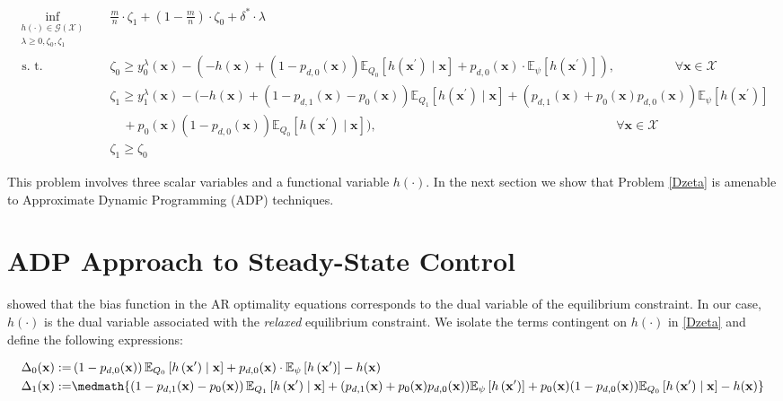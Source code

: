 \documentclass[12pt,a4paper]{article}
\newcommand{\bx}{\mathbf{x}}
\begin{document}
\begin{align} 
	 \inf_{\substack{h(\cdot)\in \mathcal{G}(\mathcal{X})\\\lambda\geq0,\zeta_0,\zeta_1}} & \quad
	\frac{m}{n} \cdot \zeta_1+\left(1-\frac{m}{n}\right) \cdot \zeta_0+\delta^* \cdot \lambda \label{Dzeta} \tag{D$_\zeta$}\\ 
	\text { s. t. }
	& \quad \zeta_0\geq y_0^\lambda(\bx) - {(-h(\bx)+\left(1-p_{d,0}(\bx)\right) \mathbb{E}_{Q_0}\left[h\left(\bx^{\prime}\right) \mid \bx\right]+p_{d,0}(\bx) \cdot \mathbb{E}_\psi\left[h\left(\bx^{\prime}\right)\right])},  \hspace{2cm}  \forall \bx \in \mathcal{X} \nonumber\\
	& \quad \zeta_1\geq y_1^\lambda(\bx)-
(-h(\bx)+\left(1-p_{d,1}(\bx) - p_0(\bx)\right) \mathbb{E}_{Q_1}\left[h\left(\bx^{\prime}\right) \mid \bx\right]+(p_{d, 1}(\bx)+ p_0(\bx)p_{d,0}(\bx)) \mathbb{E}_\psi\left[h\left(\bx^{\prime}\right)\right] \nonumber\\
& \quad \quad + p_0(\bx)(1-p_{d,0}(\bx)) \mathbb{E}_{Q_0}\left[h\left(\bx^{\prime}\right) \mid \bx\right]),
 \hspace{8cm} \forall \bx \in \mathcal{X} \nonumber\\
	& \quad \zeta_1\geq \zeta_0\nonumber
\end{align}


This problem involves three scalar variables and a functional variable $h(\cdot)$. In the next section we show that Problem \eqref{Dzeta} is amenable to Approximate Dynamic Programming (ADP) techniques.


\section{ADP Approach to Steady-State Control \label{sec:ADP}}

\cite{measurized} showed that the bias function in the AR optimality equations corresponds to the dual variable of the equilibrium constraint. In our case, $h(\cdot)$ is the dual variable associated with the {\it relaxed} equilibrium constraint. We isolate the terms contingent on $h(\cdot)$ in \eqref{Dzeta} and define the following expressions:

\begin{align} 
\Delta_{0}(\bx):= &\left(1-p_{d,0}(\bx)\right) \mathbb{E}_{Q_0}\left[h\left(\bx^{\prime}\right) \mid \bx\right]+p_{d,0}(\bx) \cdot \mathbb{E}_\psi\left[h\left(\bx^{\prime}\right)\right]-h(\bx) \label{Delta0} \\
\Delta_{1}(\bx):= & \medmath{\left(1-p_{d,1}(\bx) - p_0(\bx)\right) \mathbb{E}_{Q_1}\left[h\left(\bx^{\prime}\right) \mid \bx\right]+(p_{d,1}(\bx) + p_0(\bx)p_{d,0}(\bx)) \mathbb{E}_\psi\left[h\left(\bx^{\prime}\right)\right] +p_0(\bx)(1-p_{d,0}(\bx)) \mathbb{E}_{Q_0}\left[h\left(\bx^{\prime}\right) \mid \bx\right]-h(\bx)} \label{Delta1}
\end{align}
\end{document}
